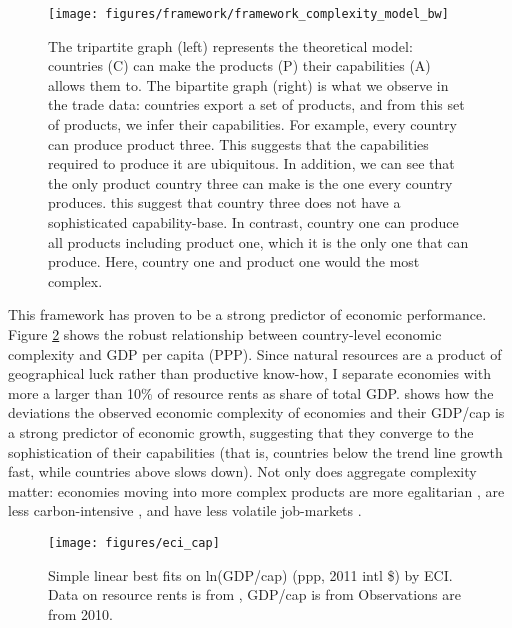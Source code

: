 \documentclass[11pt]{article}
\begin{document}
\begin{figure}[htpb]
  \centering
  \texttt{[image: figures/framework/framework\_complexity\_model\_bw]}
  \caption[The conceptual model behind Economic Complexity]{The tripartite graph (left) represents the theoretical model: countries (C) can make the products (P) their capabilities (A) allows them to. The bipartite graph (right) is what we observe in the trade data: countries export a set of products, and from this set of products, we infer their capabilities. For example, every country can produce product three. This suggests that the capabilities required to produce it are ubiquitous. In addition, we can see that the only product country three can make is the one every country produces. this suggest that country three does not have a sophisticated capability-base. In contrast, country one can produce all products including product one, which it is the only one that can produce. Here, country one and product one would the most complex.}
	\label{fig:complexity-model}
\end{figure}

This framework has proven to be a strong predictor of economic performance. Figure \ref{fig:framework-eci-gdp} shows the robust relationship between country-level economic complexity and GDP per capita (PPP). Since natural resources are a product of geographical luck rather than productive know-how, I separate economies with more a larger than 10\% of resource rents as share of total GDP. \cite{hausmann_atlas_2013} shows how the deviations the observed economic complexity of economies and their GDP/cap is a strong predictor of economic growth, suggesting that they converge to the sophistication of their capabilities (that is, countries below the trend line growth fast, while countries above slows down). Not only does aggregate complexity matter: economies moving into more complex products are more egalitarian \citep{hartmann_linking_2017-1}, are less carbon-intensive \citep{can_impact_2017}, and have less volatile job-markets \citep{adam_economic_2019}.

\begin{figure}[htpb]
	\centering
	\texttt{[image: figures/eci\_cap]}
	\caption[GDP per capita and Economic Complexity]{Simple linear best fits on ln(GDP/cap) (ppp, 2011 intl \$) by ECI. Data on resource rents is from \cite{world_bank_world_2020}, GDP/cap is from \cite{world_bank_world_2020-1} Observations are from 2010.}
	\label{fig:framework-eci-gdp}
\end{figure}
\end{document}
